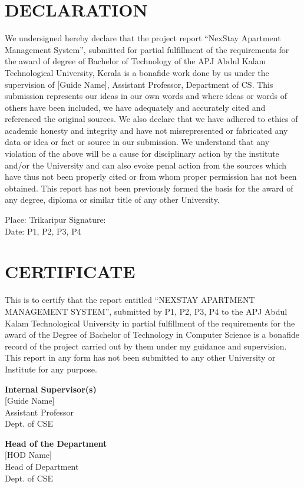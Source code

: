 \documentclass[12pt,a4paper]{report}
\begin{document}
\chapter*{DECLARATION}
We undersigned hereby declare that the project report ``NexStay Apartment Management System'', submitted for partial fulfillment of the requirements for the award of degree of Bachelor of Technology of the APJ Abdul Kalam Technological University, Kerala is a bonafide work done by us under the supervision of [Guide Name], Assistant Professor, Department of CS. This submission represents our ideas in our own words and where ideas or words of others have been included, we have adequately and accurately cited and referenced the original sources. We also declare that we have adhered to ethics of academic honesty and integrity and have not misrepresented or fabricated any data or idea or fact or source in our submission. We understand that any violation of the above will be a cause for disciplinary action by the institute and/or the University and can also evoke penal action from the sources which have thus not been properly cited or from whom proper permission has not been obtained. This report has not been previously formed the basis for the award of any degree, diploma or similar title of any other University.

\vspace{2cm}
\noindent Place: Trikaripur \hfill Signature:\\
\noindent Date: \hfill P1, P2, P3, P4

\clearpage

\chapter*{CERTIFICATE}
This is to certify that the report entitled ``NEXSTAY APARTMENT MANAGEMENT SYSTEM'', submitted by P1, P2, P3, P4 to the APJ Abdul Kalam Technological University in partial fulfillment of the requirements for the award of the Degree of Bachelor of Technology in Computer Science is a bonafide record of the project carried out by them under my guidance and supervision. This report in any form has not been submitted to any other University or Institute for any purpose.

\vspace{3cm}
\noindent
\begin{minipage}[t]{0.45\textwidth}
\textbf{Internal Supervisor(s)}\\
{[Guide Name]}\\
Assistant Professor\\
Dept. of CSE
\end{minipage}
\hfill
\begin{minipage}[t]{0.45\textwidth}
\begin{flushright}
\textbf{Head of the Department}\\
{[HOD Name]}\\
Head of Department\\
Dept. of CSE
\end{flushright}
\end{minipage}
\end{document}
